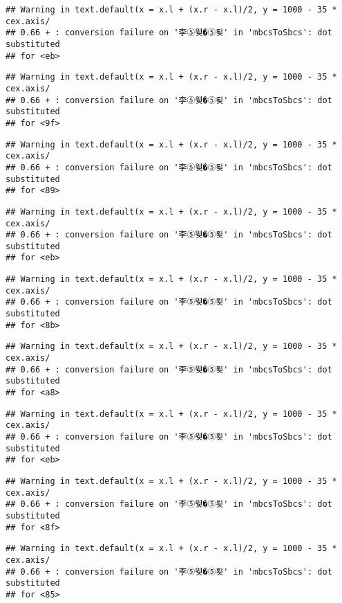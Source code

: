 \documentclass[]{article}
\begin{document}
\begin{verbatim}
## Warning in text.default(x = x.l + (x.r - x.l)/2, y = 1000 - 35 * cex.axis/
## 0.66 + : conversion failure on '李⑤웾�⑤룆' in 'mbcsToSbcs': dot substituted
## for <eb>
\end{verbatim}

\begin{verbatim}
## Warning in text.default(x = x.l + (x.r - x.l)/2, y = 1000 - 35 * cex.axis/
## 0.66 + : conversion failure on '李⑤웾�⑤룆' in 'mbcsToSbcs': dot substituted
## for <9f>
\end{verbatim}

\begin{verbatim}
## Warning in text.default(x = x.l + (x.r - x.l)/2, y = 1000 - 35 * cex.axis/
## 0.66 + : conversion failure on '李⑤웾�⑤룆' in 'mbcsToSbcs': dot substituted
## for <89>
\end{verbatim}

\begin{verbatim}
## Warning in text.default(x = x.l + (x.r - x.l)/2, y = 1000 - 35 * cex.axis/
## 0.66 + : conversion failure on '李⑤웾�⑤룆' in 'mbcsToSbcs': dot substituted
## for <eb>
\end{verbatim}

\begin{verbatim}
## Warning in text.default(x = x.l + (x.r - x.l)/2, y = 1000 - 35 * cex.axis/
## 0.66 + : conversion failure on '李⑤웾�⑤룆' in 'mbcsToSbcs': dot substituted
## for <8b>
\end{verbatim}

\begin{verbatim}
## Warning in text.default(x = x.l + (x.r - x.l)/2, y = 1000 - 35 * cex.axis/
## 0.66 + : conversion failure on '李⑤웾�⑤룆' in 'mbcsToSbcs': dot substituted
## for <a8>
\end{verbatim}

\begin{verbatim}
## Warning in text.default(x = x.l + (x.r - x.l)/2, y = 1000 - 35 * cex.axis/
## 0.66 + : conversion failure on '李⑤웾�⑤룆' in 'mbcsToSbcs': dot substituted
## for <eb>
\end{verbatim}

\begin{verbatim}
## Warning in text.default(x = x.l + (x.r - x.l)/2, y = 1000 - 35 * cex.axis/
## 0.66 + : conversion failure on '李⑤웾�⑤룆' in 'mbcsToSbcs': dot substituted
## for <8f>
\end{verbatim}

\begin{verbatim}
## Warning in text.default(x = x.l + (x.r - x.l)/2, y = 1000 - 35 * cex.axis/
## 0.66 + : conversion failure on '李⑤웾�⑤룆' in 'mbcsToSbcs': dot substituted
## for <85>
\end{verbatim}
\end{document}

